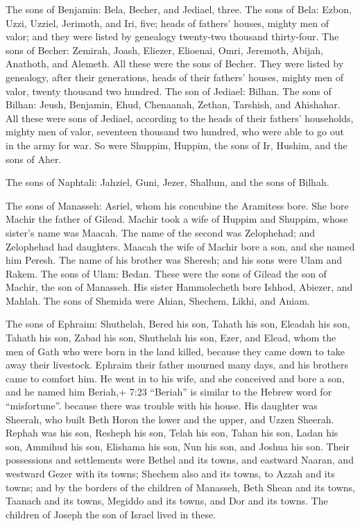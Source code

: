  The sons of Benjamin: Bela, Becher, and Jediael, three.
 The sons of Bela: Ezbon, Uzzi, Uzziel, Jerimoth, and Iri,
five; heads of fathers' houses, mighty men of valor; and they were
listed by genealogy twenty-two thousand thirty-four.  The
sons of Becher: Zemirah, Joash, Eliezer, Elioenai, Omri, Jeremoth,
Abijah, Anathoth, and Alemeth. All these were the sons of Becher.
 They were listed by genealogy, after their generations,
heads of their fathers' houses, mighty men of valor, twenty thousand two
hundred.  The son of Jediael: Bilhan. The sons of Bilhan:
Jeush, Benjamin, Ehud, Chenaanah, Zethan, Tarshish, and Ahishahar.
 All these were sons of Jediael, according to the heads of
their fathers' households, mighty men of valor, seventeen thousand two
hundred, who were able to go out in the army for war.  So
were Shuppim, Huppim, the sons of Ir, Hushim, and the sons of Aher.

 The sons of Naphtali: Jahziel, Guni, Jezer, Shallum, and
the sons of Bilhah.

 The sons of Manasseh: Asriel, whom his concubine the
Aramitess bore. She bore Machir the father of Gilead. 
Machir took a wife of Huppim and Shuppim, whose sister's name was
Maacah. The name of the second was Zelophehad; and Zelophehad had
daughters.  Maacah the wife of Machir bore a son, and she
named him Peresh. The name of his brother was Sheresh; and his sons were
Ulam and Rakem.  The sons of Ulam: Bedan. These were the
sons of Gilead the son of Machir, the son of Manasseh.  His
sister Hammolecheth bore Ishhod, Abiezer, and Mahlah.  The
sons of Shemida were Ahian, Shechem, Likhi, and Aniam.

 The sons of Ephraim: Shuthelah, Bered his son, Tahath his
son, Eleadah his son, Tahath his son,  Zabad his son,
Shuthelah his son, Ezer, and Elead, whom the men of Gath who were born
in the land killed, because they came down to take away their livestock.
 Ephraim their father mourned many days, and his brothers
came to comfort him.  He went in to his wife, and she
conceived and bore a son, and he named him Beriah,+ 7:23 ``Beriah'' is
similar to the Hebrew word for ``misfortune''. because there was trouble
with his house.  His daughter was Sheerah, who built Beth
Horon the lower and the upper, and Uzzen Sheerah.  Rephah
was his son, Resheph his son, Telah his son, Tahan his son,
 Ladan his son, Ammihud his son, Elishama his son,
 Nun his son, and Joshua his son.  Their
possessions and settlements were Bethel and its towns, and eastward
Naaran, and westward Gezer with its towns; Shechem also and its towns,
to Azzah and its towns;  and by the borders of the children
of Manasseh, Beth Shean and its towns, Taanach and its towns, Megiddo
and its towns, and Dor and its towns. The children of Joseph the son of
Israel lived in these.

